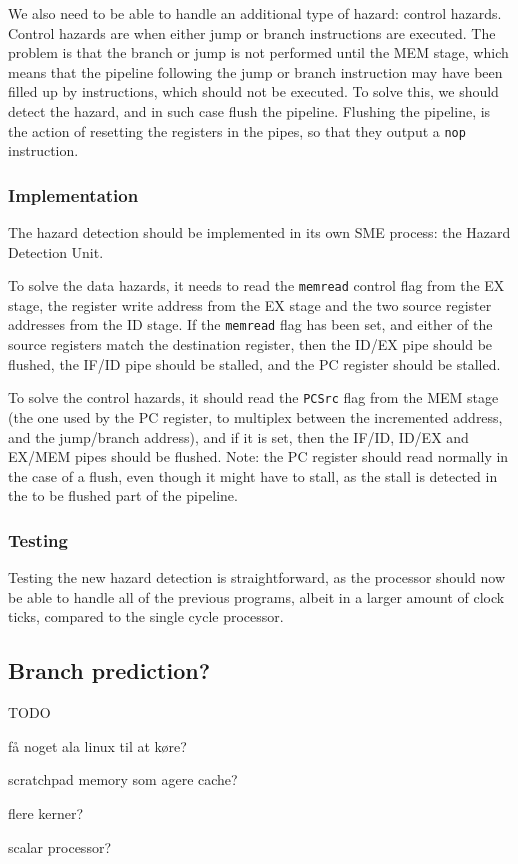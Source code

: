 We also need to be able to handle an additional type of hazard: control
hazards. Control hazards are when either jump or branch instructions are
executed. The problem is that the branch or jump is not performed until the MEM
stage, which means that the pipeline following the jump or branch instruction
may have been filled up by instructions, which should not be executed. To solve
this, we should detect the hazard, and in such case flush the pipeline.
Flushing the pipeline, is the action of resetting the registers in the pipes,
so that they output a \texttt{nop} instruction.

\subsubsection*{Implementation}
The hazard detection should be implemented in its own SME process: the Hazard
Detection Unit.

To solve the data hazards, it needs to read the \texttt{memread} control flag
from the EX stage, the register write address from the EX stage and the two
source register addresses from the ID stage. If the \texttt{memread} flag has
been set, and either of the source registers match the destination register,
then the ID/EX pipe should be flushed, the IF/ID pipe should be stalled, and
the PC register should be stalled.

To solve the control hazards, it should read the \texttt{PCSrc} flag from the
MEM stage (the one used by the PC register, to multiplex between the
incremented address, and the jump/branch address), and if it is set, then the
IF/ID, ID/EX and EX/MEM pipes should be flushed. Note: the PC register should
read normally in the case of a flush, even though it might have to stall, as
the stall is detected in the to be flushed part of the pipeline.

\subsubsection*{Testing}
Testing the new hazard detection is straightforward, as the processor should
now be able to handle all of the previous programs, albeit in a larger amount
of clock ticks, compared to the single cycle processor.

\subsection{Branch prediction?}
TODO

få noget ala linux til at køre?

scratchpad memory som agere cache?

flere kerner?

scalar processor?



